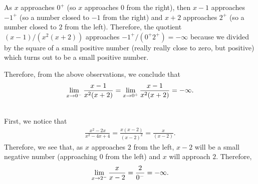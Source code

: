 	As $x$ approaches $0^+$ (so $x$ approaches $0$ from the right), then $x-1$ approaches $-1^+$ (so a number closed to $-1$ from the right) and $x + 2$ approaches $2^+$ (so a number closed to $2$ from the left). Therefore, the quotient $(x - 1)/(x^2 (x + 2))$ approaches $-1^+ / (0^+ 2^+) = -\infty$ because we divided by the square of a small positive number (really really close to zero, but positive) which turns out to be a small positive number.
	
	Therefore, from the above observations, we conclude that
		\begin{align*}
		\lim_{x \rightarrow 0^-} \frac{x - 1}{x^2 (x + 2)} = \lim_{x \rightarrow 0^+} \frac{x -1}{x^2 (x +2)} = -\infty .
		\end{align*}
	
	\spc
	
	\\
	First, we notice that
		\begin{align*}
		\frac{x^2 - 2x}{x^2 - 4x + 4} = \frac{x(x - 2)}{(x -2 )^2} = \frac{x}{(x - 2)} .
		\end{align*}
	Therefore, we see that, as $x$ approaches $2$ from the left, $x - 2$ will be a small negative number (approaching $0$ from the left) and $x$ will approach $2$. Therefore, 
		\begin{align*}
		\lim_{x \rightarrow 2^-} \frac{x}{x - 2} = \frac{2}{0^-} = -\infty .
		\end{align*}
		

